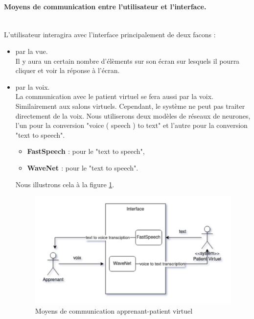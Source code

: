     \paragraph{Moyens de communication entre l'utilisateur et l'interface.} \hfill \\
    L'utilisateur interagira avec l'interface principalement de deux facons :
    \begin{itemize}
        \item par la vue. \\ Il y aura un certain nombre d'élèments sur son écran sur lesquels il pourra cliquer et voir la réponse à l'écran.
        \item par la voix. \\ La communication avec le patient virtuel se fera aussi par la voix. Similairement aux salons virtuels. Cependant, le système ne peut pas traiter directement de la voix. Nous utiliserons deux modèles de réseaux de neurones, l'un pour la conversion "voice ( speech ) to text" et l'autre pour la conversion "text to speech".
        \begin{itemize}
            \item \textbf{FastSpeech \cite{ren2019fastspeech}} : pour le "text to speech",
            \item \textbf{WaveNet \cite{oord2016wavenet}} : pour le "text to speech".
        \end{itemize}
        Nous illustrons cela à la figure \ref{fig:apprenant_patient_virtuel}.
        \begin{figure}[H]
            \centering
            \includegraphics[width=\textwidth]{figures/context-moyens de communication.png}
            \captionsetup{justification=centering}
            \caption{Moyens de communication apprenant-patient virtuel}
            \label{fig:apprenant_patient_virtuel}
        \end{figure}
    \end{itemize}
    
